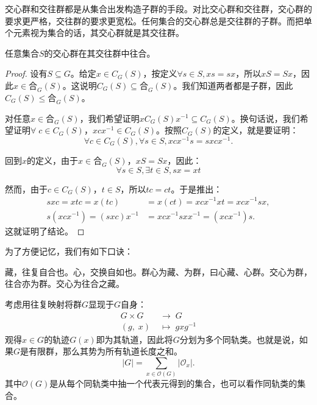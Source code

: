 \documentclass[12pt,UTF8,fontset=none]{ctexbook}
\begin{document}
交心群和交往群都是从集合出发构造子群的手段。对比交心群和交往群，交心群的要求更严格，交往群的要求更宽松。任何集合的交心群总是交往群的子群。而把单个元素视为集合的话，其交心群就是其交往群。

\begin{pp}
    任意集合$S$的交心群在其交往群中往合。
\end{pp}
\begin{proof}
    设有$S\subseteq G$。给定$x\in C_G(S)$，按定义$\forall s\in S, xs = sx$，所以$xS = Sx$，因此$x\in \text{合}_G(S)$。这说明$C_G(S)\subseteq \text{合}_G(S)$。我们知道两者都是子群，因此$C_G(S)\leq \text{合}_G(S)$。

    对任意$x\in \text{合}_G(S)$，我们希望证明$xC_G(S)x^{-1} \subseteq C_G(S)$。换句话说，我们希望证明$\forall\;c\in C_G(S)$，$xcx^{-1} \in C_G(S)$。按照$C_G(S)$的定义，就是要证明：
    $$ \forall c \in C_G(S), \forall s \in S, xcx^{-1}s = sxcx^{-1}. $$

    回到$x$的定义，由于$x\in \text{合}_G(S)$，$xS = Sx$，因此：
    $$\forall s\in S, \exists t \in S, sx = xt $$

    然而，由于$c\in C_G(S)$，$t\in S$，所以$tc = ct$。于是推出：
    \begin{align*}
        sxc = xtc = x(tc) &= x(ct) = xcx^{-1}xt = xcx^{-1}sx, \\
        s\left(xcx^{-1}\right) = (sxc)x^{-1} &= xcx^{-1}sxx^{-1} = \left(xcx^{-1}\right)s.
    \end{align*}
    这就证明了结论。
\end{proof}

为了方便记忆，我们有如下口诀：

\vspace{16pt}
{\Large 藏，往复自合也。心，交换自如也。群心为藏、为群，曰心藏、心群。交心为群，往合亦为群。交心为往合之藏。}

\vspace{16pt}

考虑用往复映射将群$G$显现于$G$自身：
\begin{align*}
    G \times G \; & \longrightarrow \; G \\
    (g, \;x) \; &\mapsto \; gxg^{-1}
\end{align*}
观得$x\in G$的轨迹$G(x)$即为其轨道，因此将$G$分划为多个同轨类。也就是说，如果$G$是有限群，那么其势为所有轨道长度之和。
$$
    |G| = \sum_{x\in \mathcal{O}(G)} |\mathcal{O}_x|.
$$
其中$\mathcal{O}(G)$是从每个同轨类中抽一个代表元得到的集合，也可以看作同轨类的集合。
\end{document}
